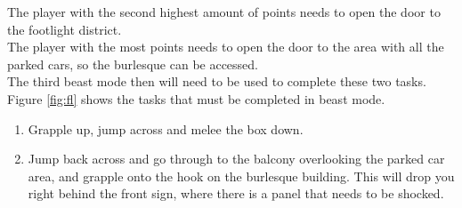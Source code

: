 \documentclass[11pt]{article} %
\begin{document}
	The player with the second highest amount of points needs to open the door to the footlight district. \\

	The player with the most points needs to open the door to the area with all the parked cars, so the burlesque can be accessed. \\

	The third beast mode then will need to be used to complete these two tasks. Figure \ref{fig:fl} shows the tasks that must be completed in beast mode.

	\begin{enumerate}
		\item Grapple up, jump across and melee the box down.
		\item Jump back across and go through to the balcony overlooking the parked car area, and grapple onto the hook on the burlesque building. This will drop you right behind the front sign, where there is a panel that needs to be shocked.
	\end{enumerate}
\end{document}
